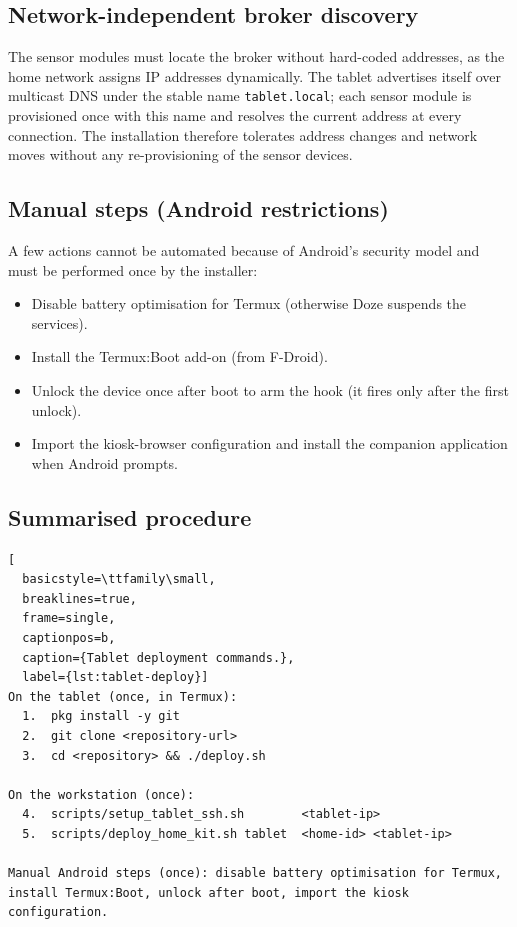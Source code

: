 \subsection{Network-independent broker discovery}

The sensor modules must locate the broker without hard-coded addresses, as the home
network assigns IP addresses dynamically. The tablet advertises itself over
multicast DNS under the stable name \texttt{tablet.local}; each sensor module is
provisioned once with this name and resolves the current address at every
connection. The installation therefore tolerates address changes and network moves
without any re-provisioning of the sensor devices.

\subsection{Manual steps (Android restrictions)}

A few actions cannot be automated because of Android's security model and must be
performed once by the installer:
\begin{itemize}
  \item Disable battery optimisation for Termux (otherwise Doze suspends the services).
  \item Install the Termux:Boot add-on (from F-Droid).
  \item Unlock the device once after boot to arm the hook (it fires only after the
        first unlock).
  \item Import the kiosk-browser configuration and install the companion
        application when Android prompts.
\end{itemize}

\subsection{Summarised procedure}

\begin{lstlisting}[
  basicstyle=\ttfamily\small,
  breaklines=true,
  frame=single,
  captionpos=b,
  caption={Tablet deployment commands.},
  label={lst:tablet-deploy}]
On the tablet (once, in Termux):
  1.  pkg install -y git
  2.  git clone <repository-url>
  3.  cd <repository> && ./deploy.sh

On the workstation (once):
  4.  scripts/setup_tablet_ssh.sh        <tablet-ip>
  5.  scripts/deploy_home_kit.sh tablet  <home-id> <tablet-ip>

Manual Android steps (once): disable battery optimisation for Termux,
install Termux:Boot, unlock after boot, import the kiosk configuration.
\end{lstlisting}
